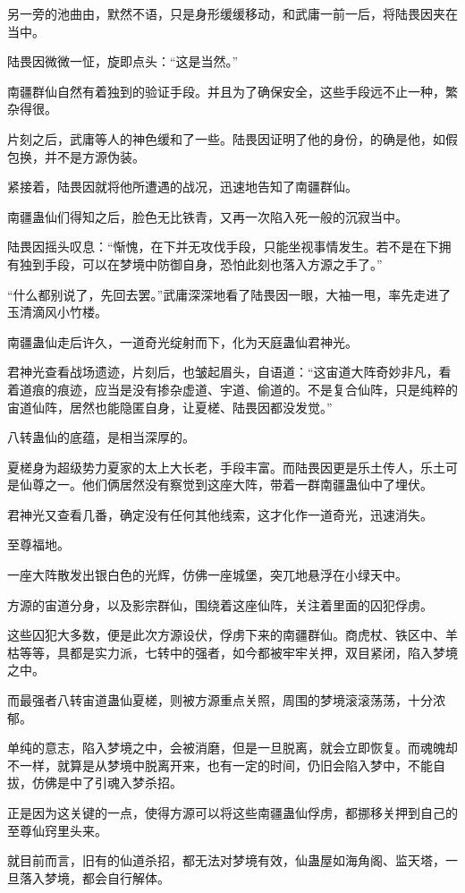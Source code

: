 \begin{this_body}
另一旁的池曲由，默然不语，只是身形缓缓移动，和武庸一前一后，将陆畏因夹在当中。

陆畏因微微一怔，旋即点头：“这是当然。”

南疆群仙自然有着独到的验证手段。并且为了确保安全，这些手段远不止一种，繁杂得很。

片刻之后，武庸等人的神色缓和了一些。陆畏因证明了他的身份，的确是他，如假包换，并不是方源伪装。

紧接着，陆畏因就将他所遭遇的战况，迅速地告知了南疆群仙。

南疆蛊仙们得知之后，脸色无比铁青，又再一次陷入死一般的沉寂当中。

陆畏因摇头叹息：“惭愧，在下并无攻伐手段，只能坐视事情发生。若不是在下拥有独到手段，可以在梦境中防御自身，恐怕此刻也落入方源之手了。”

“什么都别说了，先回去罢。”武庸深深地看了陆畏因一眼，大袖一甩，率先走进了玉清滴风小竹楼。

南疆蛊仙走后许久，一道奇光绽射而下，化为天庭蛊仙君神光。

君神光查看战场遗迹，片刻后，也皱起眉头，自语道：“这宙道大阵奇妙非凡，看着道痕的痕迹，应当是没有掺杂虚道、宇道、偷道的。不是复合仙阵，只是纯粹的宙道仙阵，居然也能隐匿自身，让夏槎、陆畏因都没发觉。”

八转蛊仙的底蕴，是相当深厚的。

夏槎身为超级势力夏家的太上大长老，手段丰富。而陆畏因更是乐土传人，乐土可是仙尊之一。他们俩居然没有察觉到这座大阵，带着一群南疆蛊仙中了埋伏。

君神光又查看几番，确定没有任何其他线索，这才化作一道奇光，迅速消失。

至尊福地。

一座大阵散发出银白色的光辉，仿佛一座城堡，突兀地悬浮在小绿天中。

方源的宙道分身，以及影宗群仙，围绕着这座仙阵，关注着里面的囚犯俘虏。

这些囚犯大多数，便是此次方源设伏，俘虏下来的南疆群仙。商虎杖、铁区中、羊枯等等，具都是实力派，七转中的强者，如今都被牢牢关押，双目紧闭，陷入梦境之中。

而最强者八转宙道蛊仙夏槎，则被方源重点关照，周围的梦境滚滚荡荡，十分浓郁。

单纯的意志，陷入梦境之中，会被消磨，但是一旦脱离，就会立即恢复。而魂魄却不一样，就算是从梦境中脱离开来，也有一定的时间，仍旧会陷入梦中，不能自拔，仿佛是中了引魂入梦杀招。

正是因为这关键的一点，使得方源可以将这些南疆蛊仙俘虏，都挪移关押到自己的至尊仙窍里头来。

就目前而言，旧有的仙道杀招，都无法对梦境有效，仙蛊屋如海角阁、监天塔，一旦落入梦境，都会自行解体。


\end{this_body}
